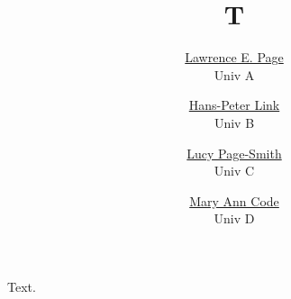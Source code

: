 \documentclass{article}
\title{T}
\author{\href{https://x.org/lp}{Lawrence E. Page} \\ Univ A \and \href{https://x.org/hj}{Hans-Peter Link} \\ Univ B \and \href{https://x.org/ls}{Lucy Page-Smith} \\ Univ C \and \href{https://x.org/mc}{Mary Ann Code} \\ Univ D}
\begin{document}
\maketitle
Text.
\end{document}
